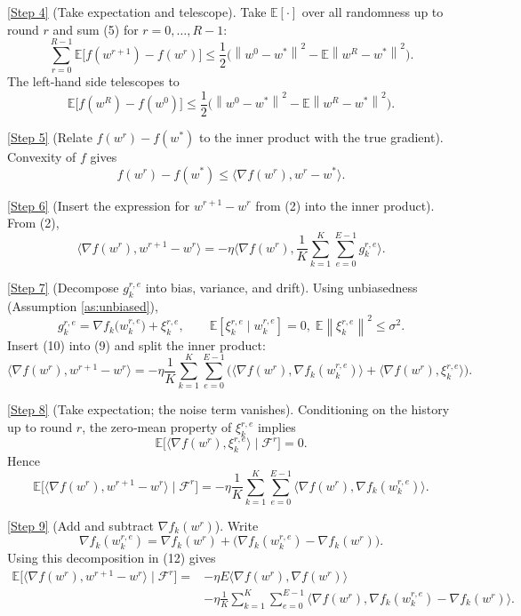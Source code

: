 \documentclass{article}
\newcommand{\E}{\mathbb{E}}
\newcommand{\norm}[1]{\left\lVert#1\right\rVert}
\newcommand{\inner}[2]{\langle #1,#2\rangle}
\newcommand{\grad}{\nabla}
\begin{document}
\noindent\underline{[Step 4]} (Take expectation and telescope).  
Take $\E[\cdot]$ over all randomness up to round $r$ and sum (5) for
$r=0,\dots,R-1$:
\[
\sum_{r=0}^{R-1}\E\!\big[f(w^{r+1})-f(w^{r})\big]
\le
\frac12\Big(\norm{w^{0}-w^{*}}^{2}-\E\!\norm{w^{R}-w^{*}}^{2}\Big). \tag{6}
\]
The left‑hand side telescopes to
\[
\E\!\big[f(w^{R})-f(w^{0})\big]\le
\frac12\Big(\norm{w^{0}-w^{*}}^{2}-\E\!\norm{w^{R}-w^{*}}^{2}\Big). \tag{7}
\]

\noindent\underline{[Step 5]} (Relate $f(w^{r})-f(w^{*})$ to the inner product
with the true gradient).  
Convexity of $f$ gives
\[
f(w^{r})-f(w^{*})\le \inner{\grad f(w^{r})}{w^{r}-w^{*}}. \tag{8}
\]

\noindent\underline{[Step 6]} (Insert the expression for $w^{r+1}-w^{r}$
from (2) into the inner product).  
From (2),
\[
\inner{\grad f(w^{r})}{w^{r+1}-w^{r}}
= -\eta\inner{\grad f(w^{r})}{\frac1K\sum_{k=1}^{K}\sum_{e=0}^{E-1} g_{k}^{r,e}}.
\tag{9}
\]

\noindent\underline{[Step 7]} (Decompose $g_{k}^{r,e}$ into bias,
variance, and drift).  
Using unbiasedness (Assumption \ref{as:unbiased}),
\[
g_{k}^{r,e}= \grad f_k\!\big(w_{k}^{r,e}\big)+\xi_{k}^{r,e},
\qquad
\E[\xi_{k}^{r,e}\mid w_{k}^{r,e}]=0,\;
\E\!\norm{\xi_{k}^{r,e}}^{2}\le\sigma^{2}. \tag{10}
\]
Insert (10) into (9) and split the inner product:
\[
\inner{\grad f(w^{r})}{w^{r+1}-w^{r}}
= -\eta\frac1K\sum_{k=1}^{K}\sum_{e=0}^{E-1}
\Big(\inner{\grad f(w^{r})}{\grad f_k(w_{k}^{r,e})}
+\inner{\grad f(w^{r})}{\xi_{k}^{r,e}}\Big). \tag{11}
\]

\noindent\underline{[Step 8]} (Take expectation; the noise term vanishes).  
Conditioning on the history up to round $r$, the zero‑mean property of
$\xi_{k}^{r,e}$ implies
\[
\E\!\big[\inner{\grad f(w^{r})}{\xi_{k}^{r,e}}\mid \mathcal F^{r}\big]=0.
\]
Hence
\[
\E\!\big[\inner{\grad f(w^{r})}{w^{r+1}-w^{r}}\mid \mathcal F^{r}\big]
= -\eta\frac1K\sum_{k=1}^{K}\sum_{e=0}^{E-1}
\inner{\grad f(w^{r})}{\grad f_k(w_{k}^{r,e})}. \tag{12}
\]

\noindent\underline{[Step 9]} (Add and subtract $\grad f_k(w^{r})$).  
Write
\[
\grad f_k(w_{k}^{r,e})=
\grad f_k(w^{r})+\big(\grad f_k(w_{k}^{r,e})-\grad f_k(w^{r})\big).
\]
Using this decomposition in (12) gives
\[
\begin{aligned}
\E\!\big[\inner{\grad f(w^{r})}{w^{r+1}-w^{r}}\mid \mathcal F^{r}\big]
=& -\eta E\inner{\grad f(w^{r})}{\grad f(w^{r})}
\\
&-\eta\frac1K\sum_{k=1}^{K}\sum_{e=0}^{E-1}
\inner{\grad f(w^{r})}{\grad f_k(w_{k}^{r,e})-\grad f_k(w^{r})}. \tag{13}
\end{aligned}
\]
\end{document}
